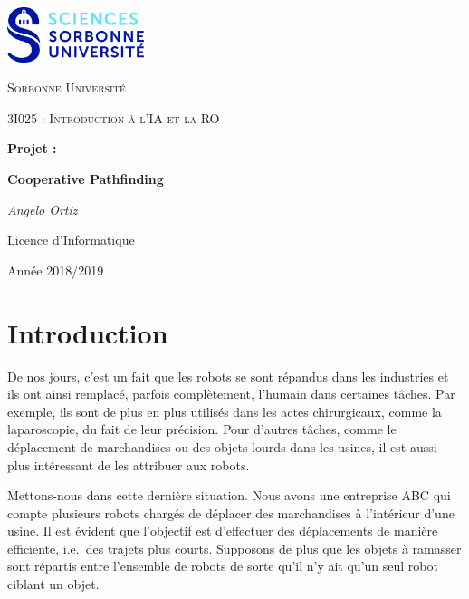 \documentclass[12pt,a4paper]{article}
\begin{document}
\begin{titlepage}
	\centering
	\includegraphics[width=0.30\textwidth]{logo.jpg}\par\vspace{1cm}
	{\scshape\LARGE Sorbonne Universit\'e \par}
	\vspace{1cm}
	{\scshape\Large 3I025 : Introduction \`a l'IA et la RO\par}
	\vspace{1.5cm}
	{\Large \bfseries Projet :\par}
	{\huge\bfseries Cooperative Pathfinding\par}
	\vspace{2cm}
	{\Large\itshape Angelo Ortiz\par}
	
	\vfill

	{\large Licence d'Informatique\par}
	{\large Ann\'ee 2018/2019\par}
\end{titlepage}


\tableofcontents
\listoffigures
\listoftables

\newpage

\part*{Introduction}

De nos jours, c'est un fait que les robots se sont r\'epandus dans les industries et ils ont ainsi remplac\'e, parfois compl\`etement, l'humain dans certaines t\^aches. 
Par exemple, ils sont de plus en plus utilis\'es dans les actes chirurgicaux, comme la laparoscopie, du fait de leur pr\'ecision.
Pour d'autres t\^aches, comme le d\'eplacement de marchandises ou des objets lourds dans les usines, il est aussi plus int\'eressant de les attribuer aux robots.

Mettons-nous dans cette derni\`ere situation.
Nous avons une entreprise ABC qui compte plusieurs robots charg\'es de d\'eplacer des marchandises \`a l'int\'erieur d'une usine. 
Il est \'evident que l'objectif est d'effectuer des d\'eplacements de mani\`ere efficiente, i.e.\ des trajets plus courts. 
Supposons de plus que les objets \`a ramasser sont r\'epartis entre l'ensemble de robots de sorte qu'il n'y ait qu'un seul robot ciblant un objet.
\end{document}
